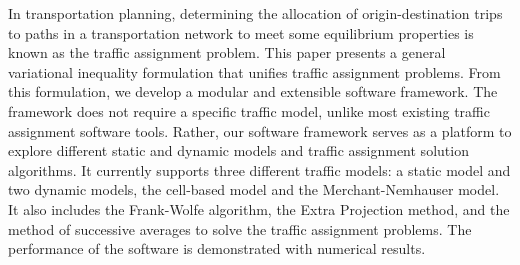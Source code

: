 In transportation planning, determining the allocation of origin-destination trips to paths in a transportation network to meet some equilibrium properties is known as the traffic assignment problem. This paper presents a general variational inequality formulation that unifies traffic assignment problems. From this formulation, we develop a modular and extensible software framework. The framework does not require a specific traffic model, unlike most existing traffic assignment software tools. Rather, our software framework serves as a platform to explore different static and dynamic models and traffic assignment solution algorithms. It currently supports three different traffic models: a static model and two dynamic models, the cell-based model and the Merchant-Nemhauser model. It also includes the Frank-Wolfe algorithm, the Extra Projection method, and the method of successive averages to solve the traffic assignment problems. The performance of the software is demonstrated with numerical results. 